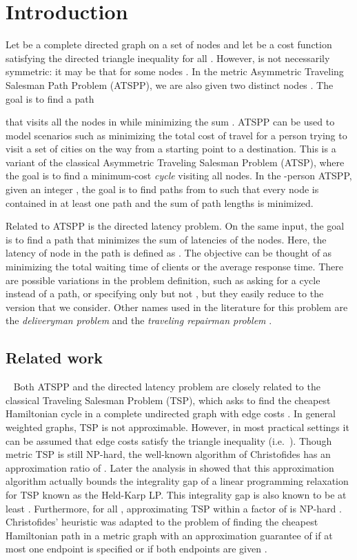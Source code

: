 \documentclass[11pt]{article}
\begin{document}
\section{Introduction}
Let  be a complete directed graph on a set of  nodes and let 
 be a cost function
satisfying the directed triangle inequality  for
all .  However,  is not necessarily symmetric: it may be that
 for some nodes .
In the metric Asymmetric Traveling Salesman Path Problem (ATSPP), we are also given
two distinct nodes .  The goal is to find a path

that visits all the nodes in  while minimizing the sum .
ATSPP can be used to model scenarios such as minimizing the total cost of travel
for a person trying to visit a set of cities on the way from a starting point to a destination. 
This is a variant of the classical Asymmetric Traveling Salesman Problem (ATSP), where the goal is to find a minimum-cost \emph{cycle} visiting all nodes.
In the -person ATSPP, given an integer , the goal is to find  paths from  to  such that every node is contained in at least one path and the sum of path lengths is minimized.


Related to ATSPP is the directed latency problem.  
On the same input, the goal is to find a 
path  that minimizes the sum of latencies of the nodes.  Here, the latency of node  in the path
is defined as .
The objective can be thought of as minimizing the total waiting time of clients or
the average response time.
There are possible variations in the problem definition, such as asking for a cycle instead of a path, or specifying only  but not , but they easily reduce to the version that we consider. 
Other names used in the literature for this problem are the {\em deliveryman problem}
\cite{minieka} and the {\em traveling repairman problem} \cite{afrati}.


\subsection{Related work}~
Both ATSPP and the directed latency problem are closely
related to the classical Traveling Salesman Problem (TSP), 
which asks to find the cheapest Hamiltonian cycle in a complete undirected graph with edge costs \cite{lawler:lenstra,gutin}.
In general weighted graphs, TSP is not approximable. However, in most practical settings it can be assumed
that edge costs satisfy the triangle inequality
(i.e.\ ).
Though metric TSP is still NP-hard, the well-known algorithm of 
Christofides \cite{christofides} has an approximation ratio of .
Later the analysis in \cite{shmoys:williamson,wolsey:heuristic} showed that this approximation algorithm actually bounds the integrality
gap of a linear programming relaxation for TSP known as the Held-Karp LP.
This integrality gap is also known to be 
at least .  Furthermore, for all
, approximating TSP within a factor of  is NP-hard \cite{papadimitriou:vempala}.
Christofides' heuristic was adapted to the problem of finding the cheapest Hamiltonian path
in a metric graph with an approximation guarantee of  if at most one endpoint is specified or  if both endpoints are given \cite{hoogeveen}.
\end{document}
